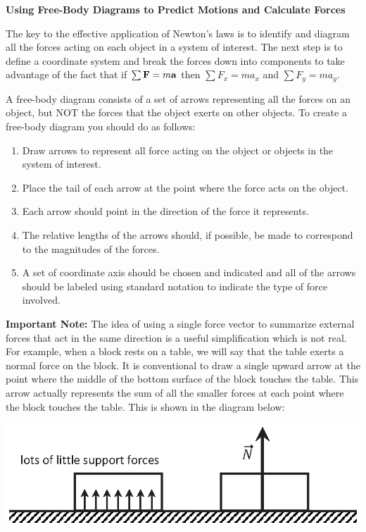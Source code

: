 \textbf{Using Free-Body Diagrams to Predict Motions and Calculate Forces }

The key to the effective application of Newton's laws is to identify and diagram
all the forces acting on each object in a system of interest. The next step
is to define a coordinate system and break the forces down into components to
take advantage of the fact that if \( \sum{\bf F}  = m{\bf a}\) then
\( \sum F_{x} = ma_{x} \) and \( \sum F_{y} =
ma_{y} \).

A free-body diagram consists of a set of arrows representing all the forces
on an object, but NOT the forces that the object exerts on other objects. To
create a free-body diagram you should do as follows: 

\begin{enumerate}
\item Draw arrows to represent all force acting on the object or objects in the system
of interest. 
\item Place the tail of each arrow at the point where the force acts on the object. 
\item Each arrow should point in the direction of the force it represents. 
\item The relative lengths of the arrows should, if possible, be made to correspond
to the magnitudes of the forces. 
\item A set of coordinate axis should be chosen and indicated and all of the arrows
should be labeled using standard notation to indicate the type of force involved.
\end{enumerate}
\textbf{Important Note:} The idea of using a single force vector to summarize
external forces that act in the same direction is a useful simplification which
is not real. For example, when a block rests on a table, we will say that the
table exerts a normal force on the block. It is conventional to draw a single
upward arrow at the point where the middle of the bottom surface of the block
touches the table. This arrow actually represents the sum of all the smaller
forces at each point where the block touches the table. This is shown in the
diagram below:

{\par\centering \includegraphics{friction/normal_forces.eps} \par}
\vspace{0.3cm}

